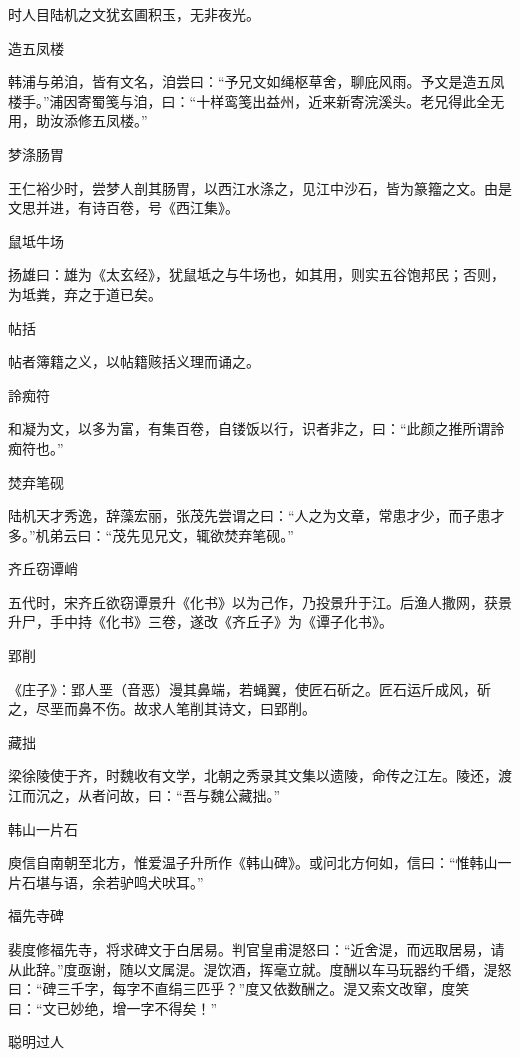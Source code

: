 \documentclass[a4paper,12pt,UTF8,twoside]{ctexbook}
\begin{document}
    时人目陆机之文犹玄圃积玉，无非夜光。
    
    造五凤楼
    
    韩浦与弟洎，皆有文名，洎尝曰：“予兄文如绳枢草舍，聊庇风雨。予文是造五凤楼手。”浦因寄蜀笺与洎，曰：“十样鸾笺出益州，近来新寄浣溪头。老兄得此全无用，助汝添修五凤楼。”
    
    梦涤肠胃
    
    王仁裕少时，尝梦人剖其肠胃，以西江水涤之，见江中沙石，皆为篆籀之文。由是文思并进，有诗百卷，号《西江集》。
    
    鼠坻牛场
    
    扬雄曰：雄为《太玄经》，犹鼠坻之与牛场也，如其用，则实五谷饱邦民；否则，为坻粪，弃之于道已矣。
    
    帖括
    
    帖者簿籍之义，以帖籍赅括义理而诵之。
    
    詅痴符
    
    和凝为文，以多为富，有集百卷，自镂饭以行，识者非之，曰：“此颜之推所谓詅痴符也。”
    
    焚弃笔砚
    
    陆机天才秀逸，辞藻宏丽，张茂先尝谓之曰：“人之为文章，常患才少，而子患才多。”机弟云曰：“茂先见兄文，辄欲焚弃笔砚。”
    
    齐丘窃谭峭
    
    五代时，宋齐丘欲窃谭景升《化书》以为己作，乃投景升于江。后渔人撒网，获景升尸，手中持《化书》三卷，遂改《齐丘子》为《谭子化书》。
    
    郢削
    
    《庄子》：郢人垩（音恶）漫其鼻端，若蝇翼，使匠石斫之。匠石运斤成风，斫之，尽垩而鼻不伤。故求人笔削其诗文，曰郢削。
    
    藏拙
    
    梁徐陵使于齐，时魏收有文学，北朝之秀录其文集以遗陵，命传之江左。陵还，渡江而沉之，从者问故，曰：“吾与魏公藏拙。”
    
    韩山一片石
    
    庾信自南朝至北方，惟爱温子升所作《韩山碑》。或问北方何如，信曰：“惟韩山一片石堪与语，余若驴鸣犬吠耳。”
    
    福先寺碑
    
    裴度修福先寺，将求碑文于白居易。判官皇甫湜怒曰：“近舍湜，而远取居易，请从此辞。”度亟谢，随以文属湜。湜饮酒，挥毫立就。度酬以车马玩器约千缗，湜怒曰：“碑三千字，每字不直绢三匹乎？”度又依数酬之。湜又索文改窜，度笑曰：“文已妙绝，增一字不得矣！”
    
    聪明过人
    
\end{document}
